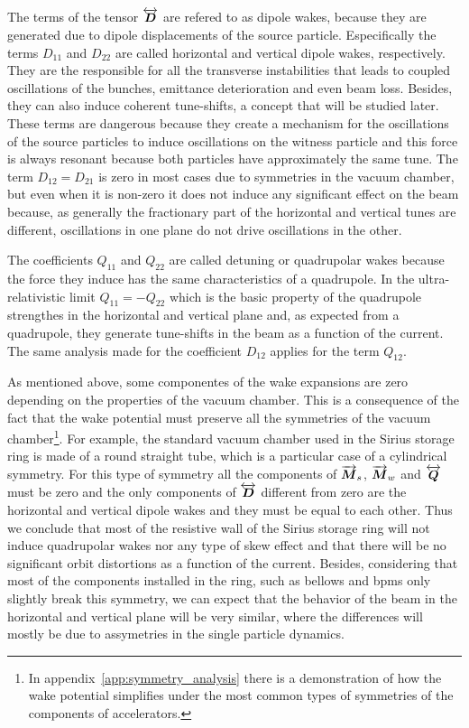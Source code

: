     The terms of the tensor $\overleftrightarrow{\boldsymbol{D}}$ are refered to as dipole wakes, because they are generated due to dipole displacements of the source particle. Especifically the terms $D_{11}$ and $D_{22}$ are called horizontal and vertical dipole wakes, respectively. They are the responsible for all the transverse instabilities that leads to coupled oscillations of the bunches, emittance deterioration and even beam loss. Besides, they can also induce coherent tune-shifts, a concept that will be studied later. These terms are dangerous because they create a mechanism for the oscillations of the source particles to induce oscillations on the witness particle and this force is always resonant because both particles have approximately the same tune. The term $D_{12}=D_{21}$ is zero in most cases due to symmetries in the vacuum chamber, but even when it is non-zero it does not induce any significant effect on the beam because, as generally the fractionary part of the horizontal and vertical tunes are different, oscillations in one plane do not drive oscillations in the other.

    The coefficients $Q_{11}$ and $Q_{22}$ are called detuning or quadrupolar wakes because the force they induce has the same characteristics of a quadrupole. In the ultra-relativistic limit $Q_{11}=-Q_{22}$ which is the basic property of the quadrupole strengthes in the horizontal and vertical plane and, as expected from a quadrupole, they generate tune-shifts in the beam as a function of the current. The same analysis made for the coefficient $D_{12}$ applies for the term $Q_{12}$.

    As mentioned above, some componentes of the wake expansions are zero depending on the properties of the vacuum chamber. This is a consequence of the fact that the wake potential must preserve all the symmetries of the vacuum chamber\footnote{In appendix~\ref{app:symmetry_analysis} there is a demonstration of how the wake potential simplifies under the most common types of symmetries of the components of accelerators.}. For example, the standard vacuum chamber used in the Sirius storage ring is made of a round straight tube, which is a particular case of a cylindrical symmetry. For this type of symmetry all the components of $\overrightarrow{\boldsymbol{M}}_s$, $\overrightarrow{\boldsymbol{M}}_w$ and $\overleftrightarrow{\boldsymbol{Q}}$ must be zero and the only components of $\overleftrightarrow{\boldsymbol{D}}$ different from zero are the horizontal and vertical dipole wakes and they must be equal to each other. Thus we conclude that most of the resistive wall of the Sirius storage ring will not induce quadrupolar wakes nor any type of skew effect and that there will be no significant orbit distortions as a function of the current. Besides, considering that most of the components installed in the ring, such as bellows and \gls{bpms} only slightly break this symmetry, we can expect that the behavior of the beam in the horizontal and vertical plane will be very similar, where the differences will mostly be due to assymetries in the single particle dynamics.

